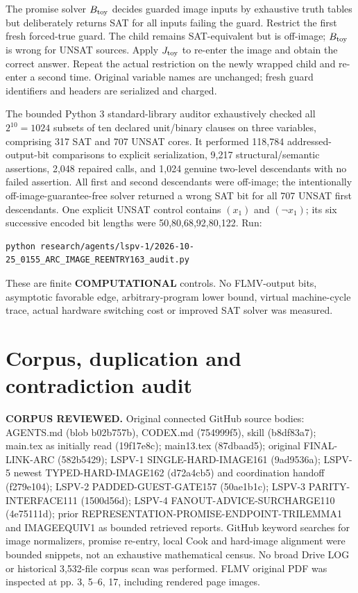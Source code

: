 \documentclass[11pt]{article}
\begin{document}
The promise solver $B_{\rm toy}$ decides guarded image inputs by exhaustive truth tables but deliberately returns SAT for all inputs failing the guard. Restrict the first fresh forced-true guard. The child remains SAT-equivalent but is off-image; $B_{\rm toy}$ is wrong for UNSAT sources. Apply $J_{\rm toy}$ to re-enter the image and obtain the correct answer. Repeat the actual restriction on the newly wrapped child and re-enter a second time. Original variable names are unchanged; fresh guard identifiers and headers are serialized and charged.

The bounded Python 3 standard-library auditor exhaustively checked all $2^{10}=1024$ subsets of ten declared unit/binary clauses on three variables, comprising 317 SAT and 707 UNSAT cores. It performed 118,784 addressed-output-bit comparisons to explicit serialization, 9,217 structural/semantic assertions, 2,048 repaired calls, and 1,024 genuine two-level descendants with no failed assertion. All first and second descendants were off-image; the intentionally off-image-guarantee-free solver returned a wrong SAT bit for all 707 UNSAT first descendants. One explicit UNSAT control contains $(x_1)$ and $(\neg x_1)$; its six successive encoded bit lengths were 50,80,68,92,80,122. Run:
\begin{verbatim}
python research/agents/lspv-1/2026-10-25_0155_ARC_IMAGE_REENTRY163_audit.py
\end{verbatim}
These are finite \textbf{COMPUTATIONAL} controls. No FLMV-output bits, asymptotic favorable edge, arbitrary-program lower bound, virtual machine-cycle trace, actual hardware switching cost or improved SAT solver was measured.

\section{Corpus, duplication and contradiction audit}
\textbf{CORPUS REVIEWED.} Original connected GitHub source bodies: AGENTS.md (blob b02b757b), CODEX.md (754999f5), skill (b8df83a7); main.tex as initially read (19f17e8c); main13.tex (87dbaad5); original FINAL-LINK-ARC (582b5429); LSPV-1 SINGLE-HARD-IMAGE161 (9ad9536a); LSPV-5 newest TYPED-HARD-IMAGE162 (d72a4cb5) and coordination handoff (f279e104); LSPV-2 PADDED-GUEST-GATE157 (50ae1b1c); LSPV-3 PARITY-INTERFACE111 (1500d56d); LSPV-4 FANOUT-ADVICE-SURCHARGE110 (4e75111d); prior REPRESENTATION-PROMISE-ENDPOINT-TRILEMMA1 and IMAGEEQUIV1 as bounded retrieved reports. GitHub keyword searches for image normalizers, promise re-entry, local Cook and hard-image alignment were bounded snippets, not an exhaustive mathematical census. No broad Drive LOG or historical 3,532-file corpus scan was performed. FLMV original PDF was inspected at pp. 3, 5--6, 17, including rendered page images.
\end{document}
